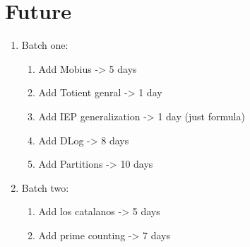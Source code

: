 \documentclass[12pt]{article}
\begin{document}
\section{Future}
\begin{enumerate}
	\item Batch one:
	\begin {enumerate}
		\item Add Mobius -> 5 days
		\item Add Totient genral -> 1 day
		\item Add IEP generalization -> 1 day (just formula)
		\item Add DLog -> 8 days
		\item Add Partitions -> 10 days
	\end{enumerate}

	\item Batch two:
	\begin {enumerate}
		\item Add los catalanos -> 5 days
		\item Add prime counting -> 7 days
	\end{enumerate}
\end{enumerate}
\end{document}
